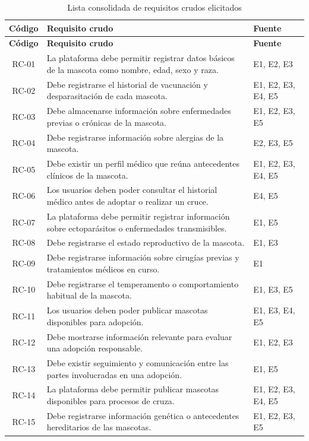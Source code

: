\documentclass[journal,onecolumn]{IEEEtran}
\begin{document}
\begin{longtable}{|c|p{8.5cm}|p{2cm}|}
\caption{Lista consolidada de requisitos crudos elicitados}
\label{tab:req_crudos}\\
\hline
\textbf{Código} & \textbf{Requisito crudo} & \textbf{Fuente} \\
\hline
\endfirsthead
\hline
\textbf{Código} & \textbf{Requisito crudo} & \textbf{Fuente} \\
\hline
\endhead
RC-01 & La plataforma debe permitir registrar datos básicos de la mascota como nombre, edad, sexo y raza. & E1, E2, E3 \\
\hline
RC-02 & Debe registrarse el historial de vacunación y desparasitación de cada mascota. & E1, E2, E3, E4, E5 \\
\hline
RC-03 & Debe almacenarse información sobre enfermedades previas o crónicas de la mascota. & E1, E2, E3, E5 \\
\hline
RC-04 & Debe registrarse información sobre alergias de la mascota. & E2, E3, E5 \\
\hline
RC-05 & Debe existir un perfil médico que reúna antecedentes clínicos de la mascota. & E1, E2, E3, E4, E5 \\
\hline
RC-06 & Los usuarios deben poder consultar el historial médico antes de adoptar o realizar un cruce. & E4, E5 \\
\hline
RC-07 & La plataforma debe permitir registrar información sobre ectoparásitos o enfermedades transmisibles. & E1, E5 \\
\hline
RC-08 & Debe registrarse el estado reproductivo de la mascota. & E1, E3 \\
\hline
RC-09 & Debe registrarse información sobre cirugías previas y tratamientos médicos en curso. & E1 \\
\hline
RC-10 & Debe registrarse el temperamento o comportamiento habitual de la mascota. & E1, E3, E5 \\
\hline
RC-11 & Los usuarios deben poder publicar mascotas disponibles para adopción. & E1, E3, E4, E5 \\
\hline
RC-12 & Debe mostrarse información relevante para evaluar una adopción responsable. & E1, E2, E3 \\
\hline
RC-13 & Debe existir seguimiento y comunicación entre las partes involucradas en una adopción. & E1, E5 \\
\hline
RC-14 & La plataforma debe permitir publicar mascotas disponibles para procesos de cruza. & E1, E2, E3, E4, E5 \\
\hline
RC-15 & Debe registrarse información genética o antecedentes hereditarios de las mascotas. & E1, E2, E3, E5 \\

\end{longtable}
\end{document}
